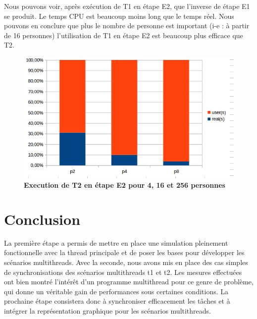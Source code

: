 \documentclass[11pt]{article} %
\begin{document}
Nous pouvons voir, après exécution de T1 en étape E2, que l'inverse de étape E1 se produit. Le temps CPU est beaucoup moins long que le temps réel. Nous pouvons en conclure que plus le nombre de personne est important (i-e : à partir de 16 personnes) l'utilisation de T1 en étape E2 est beaucoup plus efficace que T2.

\begin{figure}[h]
\caption{\label{f2} \textbf{Execution de T2 en étape E2 pour 4, 16 et 256 personnes}}
  \centering
\includegraphics[width=12cm]{e2}
\end{figure}





\newpage


\section{Conclusion}
La première étape a permis de mettre en place une simulation pleinement fonctionnelle avec la thread principale et de poser les bases pour développer les scénarios multithreads. Avec la seconde, nous avons mis en place des cas simples de synchronisations des scénarios multithreads t1 et t2.
Les mesures effectuées ont bien montré l'intérêt d'un programme multithread pour ce genre de problème, qui donne un véritable gain de performances sous certaines conditions. La prochaine étape consistera donc à synchroniser efficacement les tâches et à intégrer la représentation graphique pour les scénarios multithreads.
\end{document}

